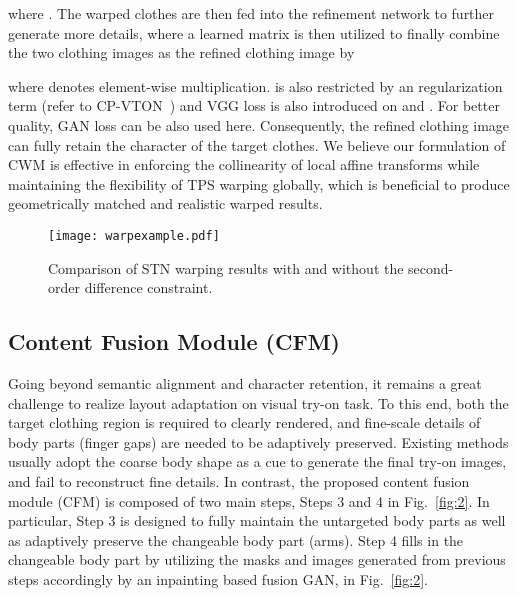 \documentclass[10pt,twocolumn,letterpaper]{article}
\begin{document}
where . The warped clothes are then fed into the refinement network to further generate more details, where a learned matrix  is then utilized to finally combine the two clothing  images as the refined clothing  image  by

where  denotes element-wise multiplication.  is also restricted by an regularization term (refer to CP-VTON~\cite{DBLP:conf/eccv/WangZLCLY18}) and VGG loss is also introduced on  and . For better quality, GAN loss can be also used here.
Consequently, the refined clothing image can fully retain the character of the target clothes.
We believe our formulation of CWM
is effective in enforcing the collinearity of local affine transforms while maintaining the flexibility of TPS warping globally, which is beneficial to produce geometrically matched and realistic warped results.




\begin{figure}[t]
\begin{center}
\texttt{[image: warpexample.pdf]}
\vspace{-10pt}
\end{center}
   \caption{\footnotesize Comparison of STN warping results with and without the second-order difference  constraint.}
\label{fig:warpexample}
\vspace{-10pt}
\end{figure}

\subsection{Content Fusion Module (CFM)}
Going beyond semantic alignment and character retention, it remains a great challenge to realize layout adaptation on visual try-on task. To this end, both the target clothing region is required to clearly rendered, and fine-scale details of body parts (\ie finger gaps) are needed to be adaptively preserved.
Existing methods usually adopt the coarse body shape as a cue to generate the final try-on images, and fail to reconstruct fine details.
In contrast, the proposed content fusion module (CFM) is composed of two main steps, \ie Steps 3 and 4 in Fig.~\ref{fig:2}. In particular, Step 3 is designed to fully maintain the untargeted body parts as well as adaptively preserve the changeable body part (\ie arms). Step 4 fills in the changeable body part by utilizing the masks and images generated from previous steps accordingly by an inpainting based fusion GAN,  in Fig.~\ref{fig:2}.
\end{document}
